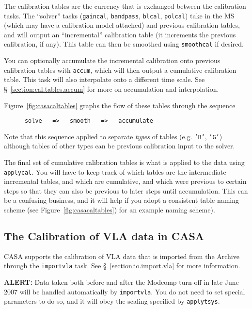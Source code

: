 The calibration tables are the currency that is exchanged between
the calibration tasks.  The ``solver'' tasks ({\tt gaincal},
{\tt bandpass}, {\tt blcal}, {\tt polcal}) take in the MS
(which may have a calibration model attached) and previous calibration
tables, and will output an ``incremental'' calibration table
(it increments the previous calibration, if any).  This table
can then be smoothed using {\tt smoothcal} if desired.

You can optionally accumulate the incremental calibration onto
previous calibration tables with {\tt accum}, which will then output a
cumulative calibration table.  This task will also interpolate onto a
different time scale.  See \S~\ref{section:cal.tables.accum} for more
on accumulation and interpolation.

Figure~\ref{fig:casacaltables} graphs the flow of these tables
through the sequence
\small
\begin{verbatim}
      solve   =>   smooth   =>   accumulate
\end{verbatim}
\normalsize
Note that this sequence applied to separate {\em types} of tables
(e.g. {\tt 'B'}, {\tt 'G'}) although tables of other types can
be previous calibration input to the solver.

The final set of cumulative calibration tables is what is applied
to the data using {\tt applycal}.  You will have to keep track of
which tables are the intermediate incremental tables, and which
are cumulative, and which were previous to certain steps so that
they can also be previous to later steps until accumulation.  This
can be a confusing business, and it will help if you adopt a
consistent table naming scheme (see Figure~\ref{fig:casacaltables})
for an example naming scheme).


\subsection{The Calibration of VLA data in CASA}
\label{section:cal.flow.vla}

CASA supports the calibration of VLA data that is 
imported from the Archive through the {\tt importvla} task.
See \S~\ref{section:io.import.vla} for more information.

{\bf ALERT:} Data taken both before and after the Modcomp turn-off in
late June 2007 will be handled automatically by {\tt importvla}.  You
do not need to set special parameters to do so, and it will obey the
scaling specified by {\tt applytsys}.


